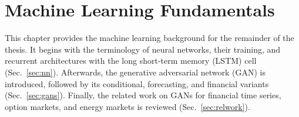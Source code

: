 \section{Machine Learning Fundamentals}\label{sec:ml-fundamentals}
This chapter provides the machine learning background for the remainder of the thesis. It begins with the terminology of neural networks, their training, and recurrent architectures with the long short-term memory (LSTM) cell (Sec.~\ref{sec:nn}). Afterwards, the generative adversarial network (GAN) is introduced, followed by its conditional, forecasting, and financial variants (Sec.~\ref{sec:gans}). Finally, the related work on GANs for financial time series, option markets, and energy markets is reviewed (Sec.~\ref{sec:relwork}).






